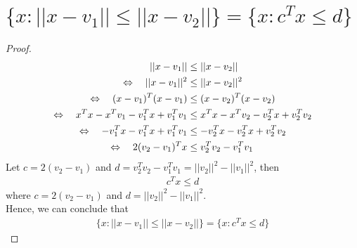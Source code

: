 \documentclass[11pt,a4paper]{article}
\begin{document}
\section{$\{x: ||x-v_1|| \leq ||x-v_2||\} = \{x: c^T x \leq d\}$}
\begin{proof}
    \begin{align}
      \hspace{0.5cm} || x - v_1 || &\leq || x - v_2|| \\
    \Leftrightarrow  \hspace{0.35cm} || x - v_1 ||^2 &\leq || x - v_2||^2 \\
    \Leftrightarrow  \hspace{0.35cm} (x-v_1)^T (x-v_1) &\leq (x - v_2)^T(x - v_2) \\
    \Leftrightarrow  \hspace{0.35cm} 
    x^Tx-x^Tv_1-v_1^Tx+v_1^Tv_1 &\leq x^Tx-x^Tv_2-v_2^Tx+v_2^Tv_2 \\
    \Leftrightarrow  \hspace{0.35cm}
    -v_1^Tx-v_1^Tx+v_1^Tv_1 &\leq -v_2^Tx-v_2^Tx+v_2^Tv_2 \\
    \Leftrightarrow  \hspace{0.35cm}
    2(v_2-v_1)^Tx &\leq v_2^Tv_2 - v_1^Tv_1
    \end{align}
    Let $c = 2(v_2-v_1)$ and 
    $d = v_2^Tv_2 - v_1^Tv_1 = ||v_2||^2 - ||v_1||^2$, then
    \begin{align}
      c^Tx \leq d
    \end{align}
    where $c = 2(v_2-v_1)$ and $d = ||v_2||^2 - ||v_1||^2$. \\
    Hence, we can conclude that 
    \begin{align}
        \{x: ||x-v_1|| \leq ||x-v_2||\} = \{x: c^T x \leq d\}
    \end{align}
\end{proof}

\newpage
\setcounter{section}{7}
\end{document}
